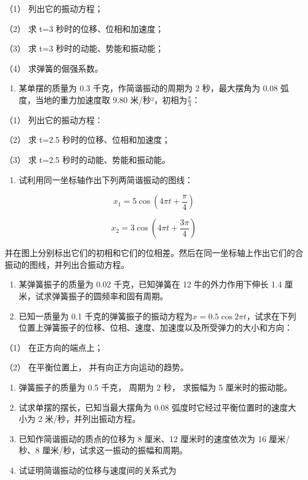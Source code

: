 （1） 列出它的振动方程；

（2） 求 t=3 秒时的位移、位相和加速度；

（3） 求 t=3 秒时的动能、势能和振动能；

（4） 求弹簧的倔强系数。

\begin{enumerate}
\def\labelenumi{\arabic{enumi}.}
\setcounter{enumi}{4}
\tightlist
\item
  某单摆的质量为 0.3 千克，作简谐振动的周期为 2 秒，最大摆角为 0.08
  弧度，当地的重力加速度取 9.80 米/秒²，初相为\(\frac{\pi}{3}\)：
\end{enumerate}

（1） 列出它的振动方程：

（2） 求 t=2.5 秒时的位移、位相和加速度；

（3） 求 t=2.5 秒时的动能、势能和振动能。

\begin{enumerate}
\def\labelenumi{\arabic{enumi}.}
\setcounter{enumi}{5}
\tightlist
\item
  试利用同一坐标轴作出下列两简谐振动的图线：
\end{enumerate}

\[
x _ {1} = 5 \cos \left(4 \pi t + \frac {\pi}{4}\right)
\]

\[
x _ {2} = 3 \cos \left(4 \pi t + \frac {3 \pi}{4}\right)
\]

并在图上分别标出它们的初相和它们的位相差。然后在同一坐标轴上作出它们的合振动的图线，并列出合振动方程。

\begin{enumerate}
\def\labelenumi{\arabic{enumi}.}
\setcounter{enumi}{6}
\item
  某弹簧振子的质量为 0.02 千克，已知弹簧在 12 牛的外力作用下伸长 1.4
  厘米，试求弹簧振子的圆频率和固有周期。
\item
  已知一质量为 0.1
  千克的弹簧振子的振动方程为\(x = 0.5 \cos 2\pi t\)，试求在下列位置上弹簧振子的位移、位相、速度、加速度以及所受弹力的大小和方向：
\end{enumerate}

（1） 在正方向的端点上；

（2） 在平衡位置上， 并有向正方向运动的趋势。

\begin{enumerate}
\def\labelenumi{\arabic{enumi}.}
\setcounter{enumi}{8}
\item
  弹簧振子的质量为 0.5 千克， 周期为 2 秒， 求振幅为 5 厘米时的振动能。
\item
  试求单摆的摆长，已知当最大摆角为 0.08
  弧度时它经过平衡位置时的速度大小为 2 米/秒，并列出振动方程。
\item
  已知作简谐振动的质点的位移为 8 厘米、12 厘米时的速度依次为 16
  厘米/秒、8 厘米/秒，试求这一振动的振幅和周期。
\item
  试证明简谐振动的位移与速度间的关系式为
\end{enumerate}

